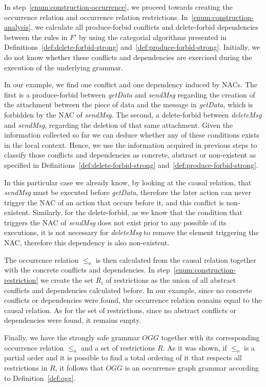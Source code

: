 In step~\ref{enum:construction-occurrence}, we proceed towards creating the occurrence relation and occurrence relation restrictions. 
  In~\ref{enum:construction-analysis}, we calculate all produce-forbid conflicts and delete-forbid dependencies between the rules in $F'$ by using the categorial algorithms presented in Definitions~\ref{def:delete-forbid-strong} and~\ref{def:produce-forbid-strong}. 
  Initially, we do not know whether these conflicts and dependencies are exercised during the execution of the underlying grammar. 

  In our example, we find one conflict and one dependency induced by NACs. The first is a produce-forbid between \emph{getData} and \emph{sendMsg} regarding the creation of the attachment between the piece of data and the message in \emph{getData}, which is forbidden by the NAC of \emph{sendMsg}.
  The second, a delete-forbid between \emph{deleteMsg} and \emph{sendMsg}, regarding the deletion of that same attachment.
  Given the information collected so far we can deduce whether any of these
conditions exists in the local context.
  Hence, we use the information acquired in previous steps to classify those conflicts and dependencies as concrete, abstract or non-existent as specified in
Definitions~\ref{def:delete-forbid-strong} and~\ref{def:produce-forbid-strong}. 

In this particular case we already know, by looking at the causal relation, that \emph{sendMsg} must be executed before \emph{getData}, therefore the later action can never trigger the NAC of an action that occurs before it, and this conflict is non-existent. Similarly, for the delete-forbid, as we know that the condition that triggers the NAC of \emph{sendMsg} does not exist prior to any possible of its executions, it is not necessary for \emph{deleteMsg} to remove the element triggering the NAC, therefore this dependency is also non-existent.

The occurrence relation $\leq_o$ is then calculated from the causal relation together with the concrete conflicts and dependencies. In step~\ref{enum:construction-restriction} we create the set $R_i$ of restrictions as the union of all abstract conflicts and dependencies calculated before. In our example, since no concrete conflicts or dependencies were found, the occurrence relation remains equal to the causal relation. As for the set of restrictions, since no abstract conflicts or dependencies
were found, it remains empty.

Finally, we have the strongly safe grammar $OGG$ together with its corresponding occurrence relation $\leq_o$ and a set of restrictions $R$. As it was shown, if $\leq_o$ is a partial order and it is possible to find a total ordering of it that respects all restrictions in $R$, it follows that $OGG$ is an occurrence graph grammar according to Definition~\ref{def:ogg}.
\linebreak

